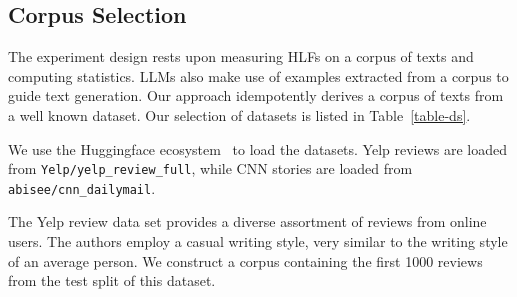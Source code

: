 \documentclass[11pt]{article}
\begin{document}
\subsection{Corpus Selection}\label{ds-selection}

The experiment design rests upon measuring HLFs on a corpus of texts and
computing statistics.
LLMs also make use of examples extracted from a corpus to guide text generation.
Our approach idempotently derives a corpus of texts from a well known dataset.
Our selection of datasets is listed in Table~\ref{table-ds}.

\begin{table}[ht]
    \setlength\tabcolsep{6pt}
    \centering
    \caption{Source Datasets}\label{table-ds}
\end{table}

We use the Huggingface ecosystem~\cite{lhoest-etal-2021-datasets} to load the
datasets.
Yelp reviews are loaded from \texttt{Yelp/yelp\_review\_full}, while CNN stories
are loaded from \texttt{abisee/cnn\_dailymail}.

The Yelp review data set provides a diverse assortment of reviews from online
users.
The authors employ a casual writing style, very similar to the writing style of
an average person.
We construct a corpus containing the first 1000 reviews from the test split of
this dataset.
\end{document}
